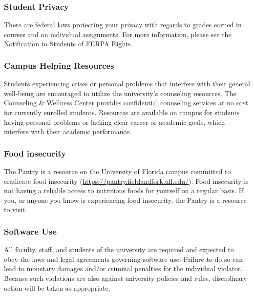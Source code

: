 \documentclass[
  12pt,
]{article}
\begin{document}
\hypertarget{student-privacy}{%
\subsubsection{\texorpdfstring{\textbf{Student
Privacy}}{Student Privacy}}\label{student-privacy}}

There are federal laws protecting your privacy with regards to grades
earned in courses and on individual assignments. For more information,
please see the Notification to Students of FERPA Rights.

\hypertarget{campus-helping-resources}{%
\subsubsection{\texorpdfstring{\textbf{Campus Helping
Resources}}{Campus Helping Resources}}\label{campus-helping-resources}}

Students experiencing crises or personal problems that interfere with
their general well-being are encouraged to utilize the university's
counseling resources. The Counseling \& Wellness Center provides
confidential counseling services at no cost for currently enrolled
students. Resources are available on campus for students having personal
problems or lacking clear career or academic goals, which interfere with
their academic performance.

\hypertarget{food-insecurity}{%
\subsubsection{\texorpdfstring{\textbf{Food
insecurity}}{Food insecurity}}\label{food-insecurity}}

The Pantry is a resource on the University of Florida campus committed
to eradicate food insecurity
(\url{https://pantry.fieldandfork.ufl.edu/}). Food insecurity is not
having a reliable access to nutritious foods for yourself on a regular
basis. If you, or anyone you know is experiencing food insecurity, the
Pantry is a resource to visit.

\hypertarget{software-use}{%
\subsubsection{\texorpdfstring{\textbf{Software
Use}}{Software Use}}\label{software-use}}

All faculty, staff, and students of the university are required and
expected to obey the laws and legal agreements governing software use.
Failure to do so can lead to monetary damages and/or criminal penalties
for the individual violator. Because such violations are also against
university policies and rules, disciplinary action will be taken as
appropriate.
\end{document}
